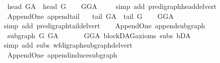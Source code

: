 \begin{isabellebody}
\ \ {\isachardoublequoteopen}head\ G{\isacharunderscore}{\kern0pt}A\ {\isacharequal}{\kern0pt}\ head\ G{\isachardoublequoteclose}\isanewline
%
\isadelimproof
\ \ %
\endisadelimproof
%
\isatagproof
{}\isamarkupfalse%
\ GG{\isacharunderscore}{\kern0pt}A\ \isanewline
\ \ \isamarkupfalse%
\ {\isacharparenleft}{\kern0pt}simp\ add{\isacharcolon}{\kern0pt}\ pre{\isacharunderscore}{\kern0pt}digraph{\isachardot}{\kern0pt}head{\isacharunderscore}{\kern0pt}del{\isacharunderscore}{\kern0pt}vert{\isacharparenright}{\kern0pt}%
\endisatagproof
{\isafoldproof}%
%
\isadelimproof
\ \isanewline
%
\endisadelimproof
\isanewline
{}\isamarkupfalse%
\ {\isacharparenleft}{\kern0pt}\ Append{\isacharunderscore}{\kern0pt}One{\isacharparenright}{\kern0pt}\ append{\isacharunderscore}{\kern0pt}tail{\isacharcolon}{\kern0pt}\ \isanewline
\ \ {\isachardoublequoteopen}tail\ G{\isacharunderscore}{\kern0pt}A\ {\isacharequal}{\kern0pt}\ tail\ G{\isachardoublequoteclose}\isanewline
%
\isadelimproof
\ \ %
\endisadelimproof
%
\isatagproof
{}\isamarkupfalse%
\ GG{\isacharunderscore}{\kern0pt}A\ \isanewline
\ \ \isamarkupfalse%
\ {\isacharparenleft}{\kern0pt}simp\ add{\isacharcolon}{\kern0pt}\ pre{\isacharunderscore}{\kern0pt}digraph{\isachardot}{\kern0pt}tail{\isacharunderscore}{\kern0pt}del{\isacharunderscore}{\kern0pt}vert{\isacharparenright}{\kern0pt}%
\endisatagproof
{\isafoldproof}%
%
\isadelimproof
\ \isanewline
%
\endisadelimproof
\isanewline
{}\isamarkupfalse%
\ {\isacharparenleft}{\kern0pt}\ Append{\isacharunderscore}{\kern0pt}One{\isacharparenright}{\kern0pt}\ append{\isacharunderscore}{\kern0pt}subgraph{\isacharcolon}{\kern0pt}\ \isanewline
\ \ {\isachardoublequoteopen}subgraph\ G\ G{\isacharunderscore}{\kern0pt}A\ {\isachardoublequoteclose}\ \isanewline
%
\isadelimproof
\ \ %
\endisadelimproof
%
\isatagproof
{}\isamarkupfalse%
\ \ GG{\isacharunderscore}{\kern0pt}A\ blockDAG{\isacharunderscore}{\kern0pt}axioms\ subs\ bD{\isacharunderscore}{\kern0pt}A\isanewline
\ \ \isamarkupfalse%
\ {\isacharparenleft}{\kern0pt}simp\ add{\isacharcolon}{\kern0pt}\ subs\ wf{\isacharunderscore}{\kern0pt}digraph{\isachardot}{\kern0pt}subgraph{\isacharunderscore}{\kern0pt}del{\isacharunderscore}{\kern0pt}vert{\isacharparenright}{\kern0pt}%
\endisatagproof
{\isafoldproof}%
%
\isadelimproof
\ \isanewline
%
\endisadelimproof
\isanewline
\isanewline
{}\isamarkupfalse%
\ {\isacharparenleft}{\kern0pt}\ Append{\isacharunderscore}{\kern0pt}One{\isacharparenright}{\kern0pt}\ append{\isacharunderscore}{\kern0pt}induce{\isacharunderscore}{\kern0pt}subgraph{\isacharcolon}{\kern0pt}\ \isanewline

\end{isabellebody}
